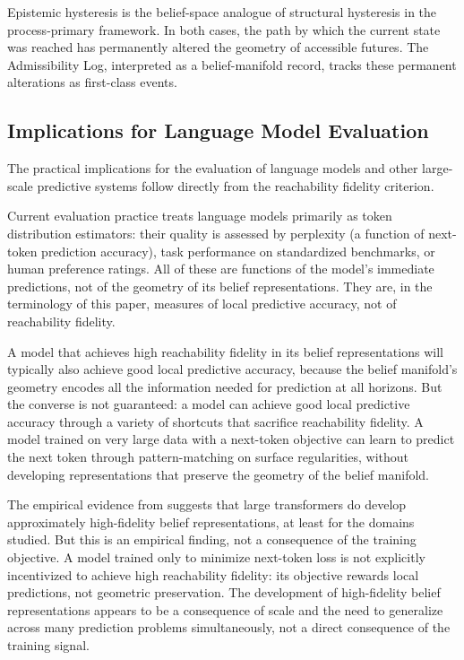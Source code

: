 \documentclass[12pt, a4paper]{article}
\theoremstyle{plain}
\theoremstyle{definition}
\theoremstyle{remark}
\begin{document}
Epistemic hysteresis is the belief-space analogue of structural hysteresis
in the process-primary framework. In both cases, the path by which the
current state was reached has permanently altered the geometry of accessible
futures. The Admissibility Log, interpreted as a belief-manifold record,
tracks these permanent alterations as first-class events.

\subsection{Implications for Language Model Evaluation}

The practical implications for the evaluation of language models and other
large-scale predictive systems follow directly from the reachability fidelity
criterion.

Current evaluation practice treats language models primarily as token
distribution estimators: their quality is assessed by perplexity (a function
of next-token prediction accuracy), task performance on standardized
benchmarks, or human preference ratings. All of these are functions of
the model's immediate predictions, not of the geometry of its belief
representations. They are, in the terminology of this paper, measures of
local predictive accuracy, not of reachability fidelity.

A model that achieves high reachability fidelity in its belief
representations will typically also achieve good local predictive accuracy,
because the belief manifold's geometry encodes all the information needed
for prediction at all horizons. But the converse is not guaranteed:
a model can achieve good local predictive accuracy through a variety of
shortcuts that sacrifice reachability fidelity. A model trained on very
large data with a next-token objective can learn to predict the next token
through pattern-matching on surface regularities, without developing
representations that preserve the geometry of the belief manifold.

The empirical evidence from \citet{shai2025} suggests that large
transformers do develop approximately high-fidelity belief representations,
at least for the domains studied. But this is an empirical finding, not
a consequence of the training objective. A model trained only to minimize
next-token loss is not explicitly incentivized to achieve high reachability
fidelity: its objective rewards local predictions, not geometric preservation.
The development of high-fidelity belief representations appears to be a
consequence of scale and the need to generalize across many prediction
problems simultaneously, not a direct consequence of the training signal.
\end{document}
